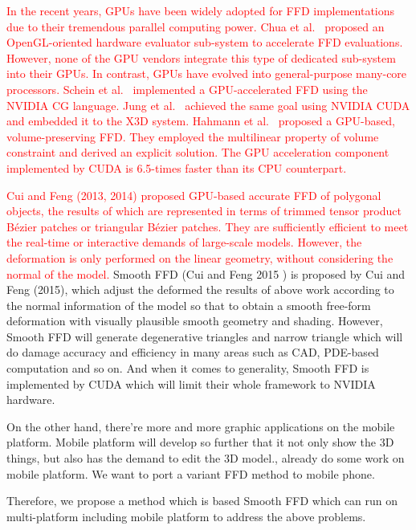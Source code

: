 \documentclass[3p]{elsarticle}
\begin{document}
\textcolor{red}{In the recent years, GPUs have been widely adopted for FFD implementations due to their tremendous parallel computing
power. Chua et al.~\cite{Chua00} proposed an OpenGL-oriented hardware evaluator sub-system to accelerate FFD
evaluations. However, none of the GPU vendors integrate this type of dedicated sub-system into their GPUs. In contrast,
GPUs have evolved into general-purpose many-core processors. Schein et al.~\cite{Schein06} implemented a GPU-accelerated
FFD using the NVIDIA CG language. Jung et al.~\cite{Jung11} achieved the same goal using NVIDIA CUDA and embedded it to
the X3D system. Hahmann et al.~\cite{Hahmann12} proposed a GPU-based, volume-preserving FFD. They employed the
multilinear property of volume constraint and derived an explicit solution. The GPU acceleration component implemented
by CUDA is 6.5-times faster than its CPU counterpart.}

\textcolor{red}{Cui and Feng (2013, 2014) proposed GPU-based accurate FFD of polygonal objects, the results of which are
represented in terms of trimmed tensor product Bézier patches or triangular Bézier patches. They are sufficiently
efficient to meet the real-time or interactive demands of large-scale models. However, the deformation is only performed
on the linear geometry, without considering the normal of the model.}
Smooth FFD (Cui and Feng 2015 ) is proposed by Cui and Feng (2015), which adjust the deformed the results of above work according to the normal information of the model so that to obtain a smooth free-form deformation with visually plausible smooth geometry and shading. However, Smooth FFD will generate degenerative triangles and narrow triangle which will do damage accuracy and efficiency in many areas such as CAD, PDE-based computation and so on. And when it comes to generality, Smooth FFD is implemented by CUDA which will limit their whole framework to NVIDIA hardware.

On the other hand, there're more and more graphic applications on the mobile platform. Mobile platform will develop so further that it not only show the 3D things, but also has the demand to edit the 3D model.\cite{mobile1}, \cite{mobile2} already do some work on mobile platform. We want to port a variant FFD method to mobile phone.

Therefore, we propose a method which is based Smooth FFD which can run on multi-platform including mobile platform to address the above problems.

\end{document}
